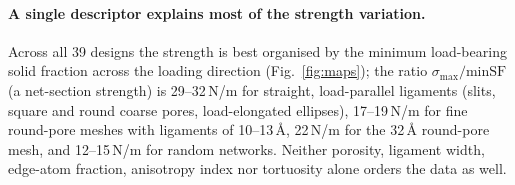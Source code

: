 \paragraph{A single descriptor explains most of the strength variation.} Across all 39 designs the strength is best organised by the minimum load-bearing solid fraction across the loading direction (Fig.~\ref{fig:maps}); the ratio $\sigma_\mathrm{max}/\mathrm{minSF}$ (a net-section strength) is 29--32\,N/m for straight, load-parallel ligaments (slits, square and round coarse pores, load-elongated ellipses), 17--19\,N/m for fine round-pore meshes with ligaments of 10--13\,\AA{}, 22\,N/m for the 32\,\AA{} round-pore mesh, and 12--15\,N/m for random networks. Neither porosity, ligament width, edge-atom fraction, anisotropy index nor tortuosity alone orders the data as well.
